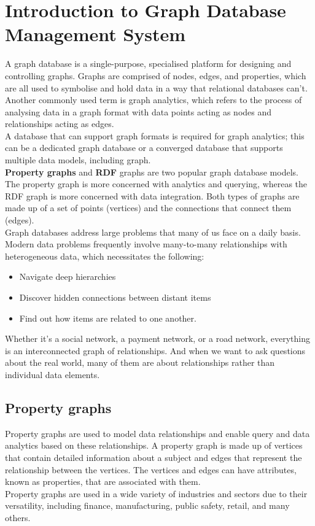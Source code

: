 \documentclass[paper=a4, fontsize=11pt]{scrartcl}
\numberwithin{equation}{section}		%
\numberwithin{figure}{section}			%
\numberwithin{table}{section}				%
\begin{document}
\section{Introduction to Graph Database Management System}
A graph database is a single-purpose, specialised platform for designing and controlling graphs. Graphs are comprised of nodes, edges, and properties, which are all used to symbolise and hold data in a way that relational databases can't.
\\
Another commonly used term is graph analytics, which refers to the process of analysing data in a graph format with data points acting as nodes and relationships acting as edges.
\\
A database that can support graph formats is required for graph analytics; this can be a dedicated graph database or a converged database that supports multiple data models, including graph.
\\
\textbf{Property graphs} and \textbf{RDF} graphs are two popular graph database models.
\\
The property graph is more concerned with analytics and querying, whereas the RDF graph is more concerned with data integration. Both types of graphs are made up of a set of points (vertices) and the connections that connect them (edges).
\\
Graph databases address large problems that many of us face on a daily basis. Modern data problems frequently involve many-to-many relationships with heterogeneous data, which necessitates the following:
\begin{itemize}
    \item Navigate deep hierarchies
    \item Discover hidden connections between distant items
    \item Find out how items are related to one another.
\end{itemize}
Whether it's a social network, a payment network, or a road network, everything is an interconnected graph of relationships. And when we want to ask questions about the real world, many of them are about relationships rather than individual data elements.
\pagebreak

\subsection{Property graphs}
Property graphs are used to model data relationships and enable query and data analytics based on these relationships. A property graph is made up of vertices that contain detailed information about a subject and edges that represent the relationship between the vertices. The vertices and edges can have attributes, known as properties, that are associated with them.
\\
Property graphs are used in a wide variety of industries and sectors due to their versatility, including finance, manufacturing, public safety, retail, and many others.
\end{document}
